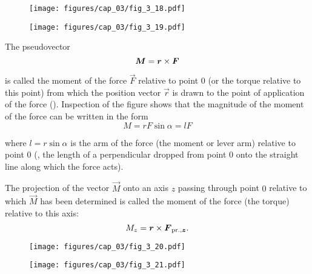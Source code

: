 \begin{figure}[t]
	\begin{minipage}[t]{0.5\linewidth}
		\begin{center}
			\texttt{[image: figures/cap\_03/fig\_3\_18.pdf]}
			\caption[]{}
			\label{fig:3_18}
		\end{center}
	\end{minipage}
	\hspace{-0.05cm}
	\begin{minipage}[t]{0.5\linewidth}
		\begin{center}
			\texttt{[image: figures/cap\_03/fig\_3\_19.pdf]}
			\caption[]{}
			\label{fig:3_19}
		\end{center}
	\end{minipage}
	\vspace{-0.3cm}
\end{figure}

The pseudovector
\begin{equation}\label{eq:3_112}
\boldsymbol{M} = \boldsymbol{r}\times\boldsymbol{F}
\end{equation}

\noindent
is called the moment of the force $\vec{F}$ relative to point $0$ (or the torque relative to this point) from which the position vector $\vec{r}$ is drawn to the point of application of the force (). Inspection of the figure shows that the magnitude of the moment of the force can be written in the form
\begin{equation}\label{eq:3_113}
M = rF\sin\alpha = lF
\end{equation}

\noindent
where $l=r\sin\alpha$ is the arm of the force (the moment or lever arm) relative to point $0$ (\ie, the length of a perpendicular dropped from point $0$ onto the straight line along which the force acts).

The projection of the vector $\vec{M}$ onto an axis $z$ passing through point $0$ relative to which $\vec{M}$ has been determined is called the moment of the force (the torque) relative to this axis:
\begin{equation}\label{eq:3_114}
M_z = \boldsymbol{r}\times\boldsymbol{F}_{\text{pr.},\boldsymbol{z}}.
\end{equation}

\begin{figure}[t]
	\begin{minipage}[t]{0.5\linewidth}
		\begin{center}
			\texttt{[image: figures/cap\_03/fig\_3\_20.pdf]}
			\caption[]{}
			\label{fig:3_20}
		\end{center}
	\end{minipage}
	\hspace{-0.05cm}
	\begin{minipage}[t]{0.5\linewidth}
		\begin{center}
			\texttt{[image: figures/cap\_03/fig\_3\_21.pdf]}
			\caption[]{}
			\label{fig:3_21}
		\end{center}
	\end{minipage}
	\vspace{-0.3cm}
\end{figure}

